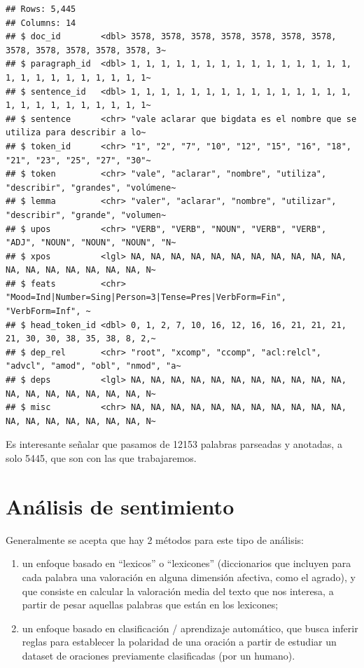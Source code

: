 \documentclass[
]{book}
\providecommand{\tightlist}{%
  \setlength{\itemsep}{0pt}\setlength{\parskip}{0pt}}
\begin{document}
\begin{verbatim}
## Rows: 5,445
## Columns: 14
## $ doc_id        <dbl> 3578, 3578, 3578, 3578, 3578, 3578, 3578, 3578, 3578, 3578, 3578, 3578, 3~
## $ paragraph_id  <dbl> 1, 1, 1, 1, 1, 1, 1, 1, 1, 1, 1, 1, 1, 1, 1, 1, 1, 1, 1, 1, 1, 1, 1, 1, 1~
## $ sentence_id   <dbl> 1, 1, 1, 1, 1, 1, 1, 1, 1, 1, 1, 1, 1, 1, 1, 1, 1, 1, 1, 1, 1, 1, 1, 1, 1~
## $ sentence      <chr> "vale aclarar que bigdata es el nombre que se utiliza para describir a lo~
## $ token_id      <chr> "1", "2", "7", "10", "12", "15", "16", "18", "21", "23", "25", "27", "30"~
## $ token         <chr> "vale", "aclarar", "nombre", "utiliza", "describir", "grandes", "volúmene~
## $ lemma         <chr> "valer", "aclarar", "nombre", "utilizar", "describir", "grande", "volumen~
## $ upos          <chr> "VERB", "VERB", "NOUN", "VERB", "VERB", "ADJ", "NOUN", "NOUN", "NOUN", "N~
## $ xpos          <lgl> NA, NA, NA, NA, NA, NA, NA, NA, NA, NA, NA, NA, NA, NA, NA, NA, NA, NA, N~
## $ feats         <chr> "Mood=Ind|Number=Sing|Person=3|Tense=Pres|VerbForm=Fin", "VerbForm=Inf", ~
## $ head_token_id <dbl> 0, 1, 2, 7, 10, 16, 12, 16, 16, 21, 21, 21, 21, 30, 30, 38, 35, 38, 8, 2,~
## $ dep_rel       <chr> "root", "xcomp", "ccomp", "acl:relcl", "advcl", "amod", "obl", "nmod", "a~
## $ deps          <lgl> NA, NA, NA, NA, NA, NA, NA, NA, NA, NA, NA, NA, NA, NA, NA, NA, NA, NA, N~
## $ misc          <chr> NA, NA, NA, NA, NA, NA, NA, NA, NA, NA, NA, NA, NA, NA, NA, NA, NA, NA, N~
\end{verbatim}

Es interesante señalar que pasamos de 12153 palabras parseadas y anotadas, a solo 5445, que son con las que trabajaremos.

\hypertarget{anuxe1lisis-de-sentimiento}{%
\section{Análisis de sentimiento}\label{anuxe1lisis-de-sentimiento}}

Generalmente se acepta que hay 2 métodos para este tipo de análisis:

\begin{enumerate}
\def\labelenumi{\arabic{enumi}.}
\tightlist
\item
  un enfoque basado en ``lexicos'' o ``lexicones'' (diccionarios que incluyen para cada palabra una valoración en alguna dimensión afectiva, como el agrado), y que consiste en calcular la valoración media del texto que nos interesa, a partir de pesar aquellas palabras que están en los lexicones;
\item
  un enfoque basado en clasificación / aprendizaje automático, que busca inferir reglas para establecer la polaridad de una oración a partir de estudiar un dataset de oraciones previamente clasificadas (por un humano).
\end{enumerate}
\end{document}
